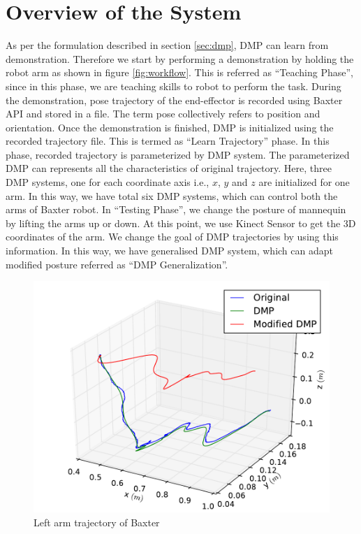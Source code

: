 \documentclass[sigconf]{acmart}
\begin{document}
\section{Overview of the System}
\label{sec:system_overview}
As per the formulation described in section \ref{sec:dmp}, DMP can learn from demonstration. Therefore we start by performing a demonstration by holding the robot arm as shown in figure \ref{fig:workflow}. This is referred as ``Teaching Phase'', since in this phase, we are teaching skills to robot to perform the task.  During the demonstration, pose trajectory of the end-effector is recorded using Baxter API and stored in a file. The term pose collectively refers to position and orientation. Once the demonstration is finished, DMP is initialized using the recorded trajectory file. This is termed as ``Learn Trajectory'' phase. In this phase, recorded trajectory is parameterized by DMP system. The parameterized DMP can represents all the characteristics of original trajectory. Here, three DMP systems, one for each coordinate axis i.e., $x$, $y$ and $z$ are initialized for one arm. In this way, we have total six DMP systems, which can control both the arms of Baxter robot. In ``Testing Phase'', we change the posture of mannequin by lifting the arms up or down. At this point, we use Kinect Sensor to get the 3D coordinates of the arm. We change the goal of DMP trajectories by using this information. In this way, we have generalised DMP system, which can adapt modified posture referred as ``DMP Generalization''.

\begin{figure}
	\includegraphics[width=\linewidth]{all_traj}
	\caption{Left arm trajectory of Baxter}
	\label{fig:trajectory}
\end{figure}
\end{document}
